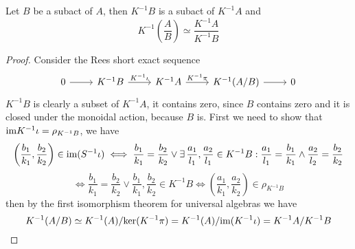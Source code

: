 \begin{corollary}
    Let $B$ be a subact of $A$, then $K^{-1}B$ is a subact of $K^{-1}A$ and  
    \[
        K^{-1}\left(\frac{A}{B}\right) \simeq \frac{K^{-1}A}{K^{-1}B}
    \]
\end{corollary}
\begin{proof}[Proof]
    Consider the Rees short exact sequence 
    \[\begin{tikzcd}
        0 & {K^{-1}B} & {K^{-1}A} & {K^{-1}(A/B)} & 0
        \arrow[from=1-1, to=1-2]
        \arrow["{K^{-1}\iota}", from=1-2, to=1-3]
        \arrow["{K^{-1}\pi}", from=1-3, to=1-4]
        \arrow[from=1-4, to=1-5]
    \end{tikzcd}\]
    $K^{-1}B$ is clearly a subset of $K^{-1}A$, it contains zero, since $B$ contains zero and 
    it is closed under the monoidal action, because $B$ is.
    First we need to show that $\text{im} K^{-1}\iota = \rho_{K^{-1}B}$, we have 
    \[
    \left(\frac{b_1}{k_1},\frac{b_2}{k_2}\right)\in\text{im}(S^{-1}\iota) \iff \frac{b_1}{k_1}=\frac{b_2}{k_2}\lor\exists\,\frac{a_1}{l_1},\frac{a_2}{l_1}\in K^{-1}B :
    \frac{a_1}{l_1}=\frac{b_1}{k_1}\land\frac{a_2}{l_2}=\frac{b_2}{k_2}
    \]
    \[
        \iff \frac{b_1}{k_1}=\frac{b_2}{k_2}\lor \frac{b_1}{k_1},\frac{b_2}{k_2}\in K^{-1}B \iff \left(\frac{a_1}{k_1},\frac{a_2}{k_2}\right)\in\rho_{K^{-1}B}
    \]
    then by the first isomorphism theorem for universal algebras we have 
    \[
    K^{-1}(A/B)\simeq K^{-1}(A)/\mathrm{ker}(K^{-1}\pi) = K^{-1}(A)/\text{im}(K^{-1}\iota) = K^{-1}A/K^{-1}B
    \]
\end{proof}

